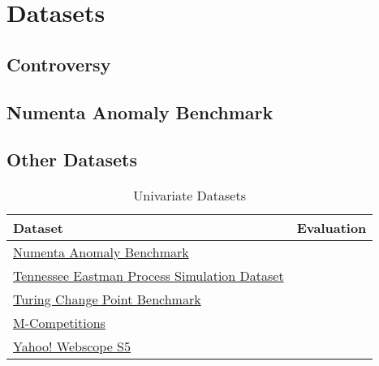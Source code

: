 \section{Datasets}\label{sect:datasets}
\subsection{Controversy}
\blindtext[2]

\subsection{Numenta Anomaly Benchmark}
\blindtext[4]

\subsection{Other Datasets}
\blindtext[2]

\begin{table}[h]\centering
        \begin{tabular}{ll}
            Dataset                                                                                                                             & Evaluation    \\\midrule
            \href{https://github.com/numenta/NAB}{Numenta Anomaly Benchmark}                                                                    &               \\\addlinespace
            \href{https://www.kaggle.com/averkij/tennessee-eastman-process-simulation-dataset}{Tennessee Eastman Process Simulation Dataset}    &               \\\addlinespace
            \href{https://github.com/alan-turing-institute/TCPDBench}{Turing Change Point Benchmark}                                            &               \\\addlinespace
            \href{https://en.wikipedia.org/wiki/Makridakis\_Competitions}{M-Competitions}                                                       &               \\\addlinespace
            \href{https://webscope.sandbox.yahoo.com/catalog.php?datatype=s\&did=70}{Yahoo! Webscope S5}                                        &               \\
        \end{tabular}
    \caption{Univariate Datasets}\label{tab:datasets}
\end{table}

